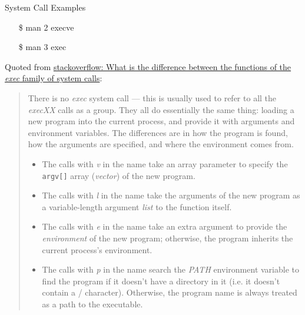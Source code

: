 \begin{frame}{System Call Examples}
  \begin{block}{}
    \begin{center}
    \end{center}
  \end{block}
  \qquad{}
\end{frame}

\begin{frame}
  \begin{block}{}
    \begin{center}
    \end{center}
  \end{block}\ttfamily
  \begin{itemize}
  \item[\$] man 2 execve
  \item[\$] man 3 exec
  \end{itemize}
\end{frame}

Quoted from
\href{https://stackoverflow.com/questions/20823371/what-is-the-difference-between-the-functions-of-the-exec-family-of-system-calls}{
  stackoverflow: What is the difference between the functions of the \emph{exec} family of system calls}:

\begin{quote}
  There is no \emph{exec} system call --- this is usually used to refer to all the
  \emph{execXX} calls as a group. They all do essentially the same thing: loading a new
  program into the current process, and provide it with arguments and environment
  variables. The differences are in how the program is found, how the arguments are
  specified, and where the environment comes from.

  \begin{itemize}
  \item The calls with \emph{v} in the name take an array parameter to specify the
    \texttt{argv[]} array (\emph{vector}) of the new program.
  \item The calls with \emph{l} in the name take the arguments of the new program as a
    variable-length argument \emph{list} to the function itself.
  \item The calls with \emph{e} in the name take an extra argument to provide the
    \emph{environment} of the new program; otherwise, the program inherits the current
    process's environment.
  \item The calls with \emph{p} in the name search the \emph{PATH} environment variable to
    find the program if it doesn't have a directory in it (i.e. it doesn't contain a /
    character). Otherwise, the program name is always treated as a path to the executable.
  \end{itemize}
\end{quote}

